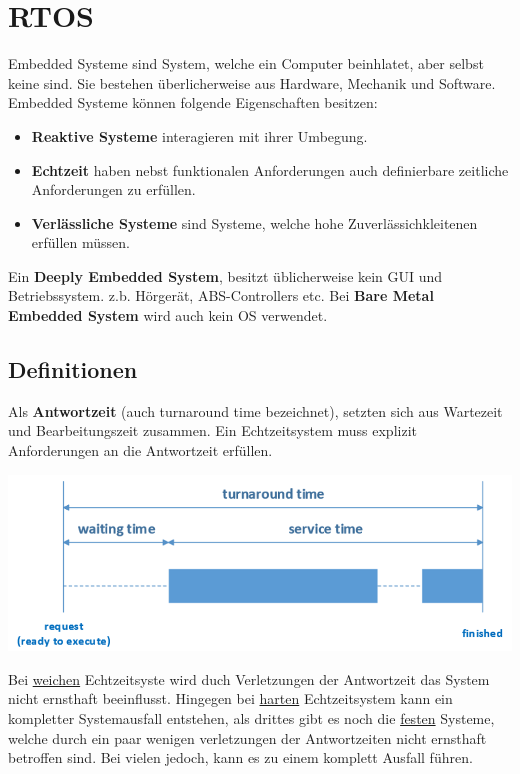 \section{RTOS}
Embedded Systeme sind System, welche ein Computer beinhlatet, aber selbst keine sind. Sie bestehen überlicherweise aus Hardware, Mechanik und Software. Embedded Systeme können folgende Eigenschaften besitzen:
\begin{itemize}
	\item \textbf{Reaktive Systeme} interagieren mit ihrer Umbegung.
	\item \textbf{Echtzeit} haben nebst funktionalen Anforderungen auch definierbare zeitliche Anforderungen zu erfüllen.
	\item \textbf{Verlässliche Systeme} sind Systeme, welche hohe Zuverlässichkleitenen erfüllen müssen.
\end{itemize}

Ein \textbf{Deeply Embedded System}, besitzt üblicherweise kein GUI und Betriebssystem. z.b. Hörgerät, ABS-Controllers etc. Bei \textbf{Bare Metal Embedded System} wird auch kein OS verwendet.

\subsection{Definitionen}
Als \textbf{Antwortzeit} (auch turnaround time bezeichnet), setzten sich aus Wartezeit und Bearbeitungszeit zusammen. Ein Echtzeitsystem muss explizit Anforderungen an die Antwortzeit erfüllen. 
\begin{center}
	\includegraphics[width=\columnwidth]{Images/zeitdefinition}
\end{center}

Bei \underline{weichen} Echtzeitsyste wird duch Verletzungen der Antwortzeit das System nicht ernsthaft beeinflusst. Hingegen bei \underline{harten} Echtzeitsystem kann ein kompletter Systemausfall entstehen, als drittes gibt es noch die \underline{festen} Systeme, welche durch ein paar 
wenigen verletzungen der Antwortzeiten nicht ernsthaft betroffen sind. Bei vielen jedoch, kann es zu einem komplett Ausfall führen.

